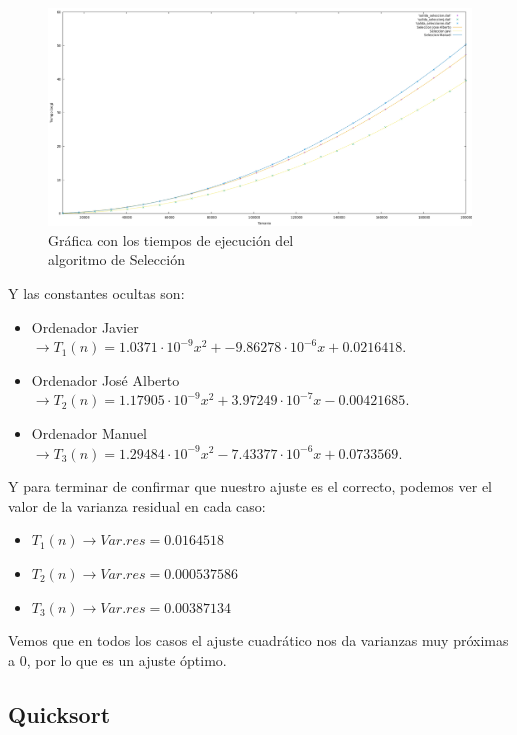\documentclass[10pt,a4paper]{article}
\begin{document}
\newpage

\begin{figure}[h!]
	\centering
	\includegraphics[scale=0.15]{../../Images/Seleccion_combinados.png}
	\caption{Gráfica con los tiempos de ejecución del \\algoritmo de Selección}
\end{figure}

Y las constantes ocultas son:
\begin{itemize}
	\item Ordenador Javier \(\rightarrow T_1(n) = 1.0371 \cdot 10^{-9} x^2 + -9.86278 \cdot 10^{-6} x +0.0216418\).
	\item Ordenador José Alberto \(\rightarrow T_2(n) = 1.17905 \cdot 10^{-9} x^2 + 3.97249 \cdot 10^{-7} x - 0.00421685\).
	\item Ordenador Manuel \(\rightarrow T_3(n) = 1.29484 \cdot 10^{-9} x^2 - 7.43377 \cdot 10^{-6} x + 0.0733569\).
\end{itemize}

Y para terminar de confirmar que nuestro ajuste es el correcto, podemos ver el valor de la varianza residual en cada caso:

\begin{itemize}
	\item \(T_1(n) \longrightarrow Var.res = 0.0164518\)
	\item \(T_2(n) \longrightarrow Var.res = 0.000537586\)
	\item \(T_3(n) \longrightarrow Var.res = 0.00387134\)
\end{itemize}

Vemos que en todos los casos el ajuste cuadrático nos da varianzas muy próximas a 0, por lo que es un ajuste óptimo.

\subsection{Quicksort}

\end{document}
